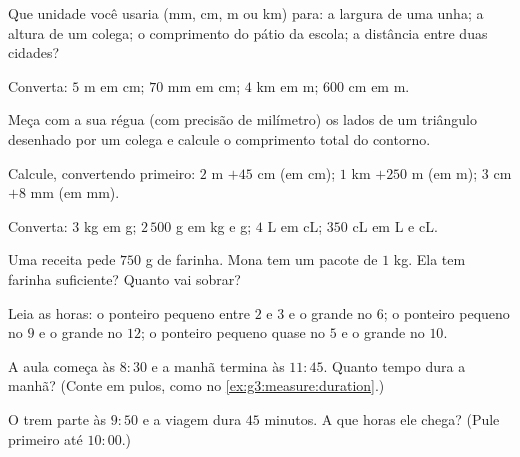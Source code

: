 \begin{exercise}[$\star$]\label{exo:g3:measure:1}
Que unidade você usaria (mm, cm, m ou km) para: a largura de uma
unha; a altura de um colega; o comprimento do pátio da escola; a
distância entre duas cidades?
\end{exercise}

\begin{exercise}[$\star$]\label{exo:g3:measure:2}
Converta: $5$ m em cm; \quad $70$ mm em cm; \quad $4$ km em m;
\quad $600$ cm em m.
\end{exercise}

\begin{exercise}[$\star$]\label{exo:g3:measure:3}
Meça com a sua régua (com precisão de milímetro) os lados de um
triângulo desenhado por um colega e calcule o comprimento total do
contorno.
\end{exercise}

\begin{exercise}[$\star$]\label{exo:g3:measure:4}
Calcule, convertendo primeiro: $2$ m $+ 45$ cm (em cm); \quad
$1$ km $+ 250$ m (em m); \quad $3$ cm $+ 8$ mm (em mm).
\end{exercise}

\begin{exercise}[$\star$]\label{exo:g3:measure:5}
Converta: $3$ kg em g; \quad $2\,500$ g em kg e g; \quad
$4$ L em cL; \quad $350$ cL em L e cL.
\end{exercise}

\begin{exercise}[$\star$]\label{exo:g3:measure:6}
Uma receita pede $750$ g de farinha. Mona tem um pacote de $1$ kg.
Ela tem farinha suficiente? Quanto vai sobrar?
\end{exercise}

\begin{exercise}[$\star$]\label{exo:g3:measure:7}
Leia as horas: o ponteiro pequeno entre $2$ e $3$ e o grande no $6$;
o ponteiro pequeno no $9$ e o grande no $12$; o ponteiro pequeno
quase no $5$ e o grande no $10$.
\end{exercise}

\begin{exercise}[$\star$]\label{exo:g3:measure:8}
A aula começa às $8{:}30$ e a manhã termina às $11{:}45$. Quanto
tempo dura a manhã? (Conte em pulos, como no
\cref{ex:g3:measure:duration}.)
\end{exercise}

\begin{exercise}[$\star$]\label{exo:g3:measure:9}
O trem parte às $9{:}50$ e a viagem dura $45$ minutos. A que horas
ele chega? (Pule primeiro até $10{:}00$.)
\end{exercise}

